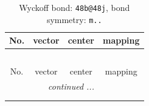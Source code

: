 \documentclass[fleqn,8pt]{jsarticle}
\begin{document}
\renewcommand{\arraystretch}{1.2}
\begin{longtable}{cccc}
\caption{Wyckoff bond: {\tt 48b@48j}, bond symmetry: {\tt m..}}
 \\
 \hline \hline
No. & vector & center & mapping \\ \hline \endfirsthead

\multicolumn{3}{l}{\tablename\ \thetable{}} \\
 \hline \hline
No. & vector & center & mapping \\ \hline \endhead

 \hline \hline
\multicolumn{3}{r}{\footnotesize\it continued ...} \\ \endfoot

 \hline \hline
\multicolumn{3}{r}{} \\ \endlastfoot


\end{longtable}
\end{document}

